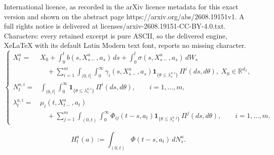 \documentclass[10pt,a4paper]{amsart}
\begin{document}
International licence, as recorded in the arXiv licence metadata for this exact version and shown on the abstract page https://arxiv.org/abs/2608.19151v1. A full rights notice is delivered at licenses/arxiv-2608.19151-CC-BY-4.0.txt. Characters: every retained excerpt is pure ASCII, so the delivered engine, XeLaTeX with its default Latin Modern text font, reports no missing character.
\begin{equation}
\label{eq:poisson-embedded-hawkes-sde}
\left\{
\begin{aligned}
X_t^a
={}&X_0
+\int_0^t b(s,X_{s-}^a,a_s)\,ds
+\int_0^t \sigma(s,X_{s-}^a,a_s)\,dW_s
\\
&\quad
+\sum_{i=1}^m
\int_{(0,t]}\int_0^\infty
\gamma_i(s,X_{s-}^a,a_s)
\mathbf{1}_{\{\theta\leq\lambda_s^{a,i}\}}
\,\Pi^i(ds,d\theta),\; X_0\in \mathbb R^{d_x},
\\[0.25cm]
N_t^{a,i}
={}&
\int_{(0,t]}\int_0^\infty
\mathbf{1}_{\{\theta\leq\lambda_s^{a,i}\}}
\,\Pi^i(ds,d\theta),
\qquad i=1,\ldots,m,
\\[0.25cm]
\lambda_t^{a,i}
={}&
\mu_i(t,X_{t-}^a,a_t)
\\
&\quad
+\sum_{j=1}^m
\int_{(0,t)}\int_0^\infty
\Phi_{ij}(t-s,a_t)
\mathbf{1}_{\{\theta\leq\lambda_s^{a,j}\}}
\,\Pi^j(ds,d\theta),
\qquad i=1,\ldots,m.
\end{aligned}
\right.
\end{equation}

\begin{equation}
\label{eq:current-action-memory}
H_t^a(a)
:=
\int_{(0,t)}\Phi(t-s,a_t)\,dN_s^a.
\end{equation}
\end{document}
